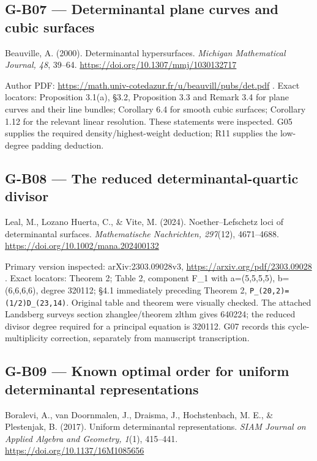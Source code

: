 \documentclass[11pt,a4paper]{article}
\theoremstyle{definition}\newtheorem{definition}{Definition}
\begin{document}
\subsection{G-B07 --- Determinantal plane curves and cubic
surfaces}\label{g-b07--determinantal-plane-curves-and-cubic-surfaces}

Beauville, A. (2000). Determinantal hypersurfaces. \emph{Michigan
Mathematical Journal, 48}, 39--64.
\url{https://doi.org/10.1307/mmj/1030132717}

Author PDF: \url{https://math.univ-cotedazur.fr/u/beauvill/pubs/det.pdf}
. Exact locators: Proposition 3.1(a), §3.2, Proposition 3.3 and Remark
3.4 for plane curves and their line bundles; Corollary 6.4 for smooth
cubic surfaces; Corollary 1.12 for the relevant linear resolution. These
statements were inspected. G05 supplies the required
density/highest-weight deduction; R11 supplies the low-degree padding
deduction.

\subsection{G-B08 --- The reduced determinantal-quartic
divisor}\label{g-b08--the-reduced-determinantal-quartic-divisor}

Leal, M., Lozano Huerta, C., \& Vite, M. (2024). Noether--Lefschetz loci
of determinantal surfaces. \emph{Mathematische Nachrichten, 297}(12),
4671--4688. \url{https://doi.org/10.1002/mana.202400132}

Primary version inspected: arXiv:2303.09028v3,
\url{https://arxiv.org/pdf/2303.09028} . Exact locators: Theorem 2;
Table 2, component F\_1 with a=(5,5,5,5), b=(6,6,6,6), degree 320112;
§4.1 immediately preceding Theorem 2,
\nolinkurl{P_(20,2)=(1/2)D_(23,14)}. Original table and theorem were
visually checked. The attached Landsberg survey\textquotesingle s
section zhanglee/theorem zlthm gives 640224; the reduced divisor degree
required for a principal equation is 320112. G07 records this
cycle-multiplicity correction, separately from manuscript transcription.

\subsection{G-B09 --- Known optimal order for uniform determinantal
representations}\label{g-b09--known-optimal-order-for-uniform-determinantal-representations}

Boralevi, A., van Doornmalen, J., Draisma, J., Hochstenbach, M. E., \&
Plestenjak, B. (2017). Uniform determinantal representations. \emph{SIAM
Journal on Applied Algebra and Geometry, 1}(1), 415--441.
\url{https://doi.org/10.1137/16M1085656}
\end{document}
